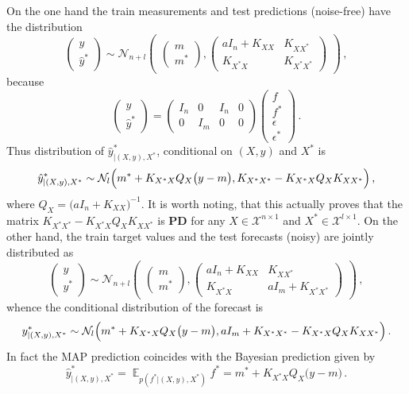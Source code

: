 \documentclass[a4paper,14pt]{article}
\newcommand{\ex}{\mathop{\mathbb{E}}\nolimits}
\newcommand{\Ncal}{\mathcal{N}}
\newcommand{\Xcal}{\mathcal{X}}
\begin{document}
On the one hand the train measurements and test predictions (noise-free) have the
distribution
$$ \begin{pmatrix} y \\ \hat{y}^* \end{pmatrix}
  \sim \Ncal_{n+l}\begin{pmatrix}
    \begin{pmatrix} m \\ m^* \end{pmatrix},
    \begin{pmatrix}
      a I_n + K_{XX} & K_{XX^*} \\
      K_{X^*X} & K_{X^*X^*}
    \end{pmatrix}
  \end{pmatrix}
  \,, $$
because
$$ \begin{pmatrix} y \\ \hat{y}^* \end{pmatrix}
  = \begin{pmatrix}
      I_n & 0 & I_n & 0 \\
      0 & I_m & 0 & 0
      \end{pmatrix}
  \begin{pmatrix} f \\ f^* \\ \epsilon \\ \epsilon^* \end{pmatrix}
  \,. $$
Thus distribution of $\hat{y}^*_{|(X, y), X^*}$, conditional on $(X,y)$ and $X^*$ is
$$ \hat{y}^*_{|(X, y), X^*}
  \sim \Ncal_l\Bigl(
    m^* + K_{X^*X} Q_X \bigl(y - m\bigr),
    K_{X^*X^*} - K_{X^*X} Q_X K_{XX^*}
  \Bigr) \,, $$
where $Q_X = \bigl(a I_n + K_{XX}\bigr)^{-1}$. It is worth noting, that this
actually proves that the matrix $K_{X^*X^*} - K_{X^*X} Q_X K_{XX^*}$ is \textbf{PD}
for any $X\in\Xcal^{n\times1}$ and $X^*\in\Xcal^{l\times1}$.
On the other hand, the train target values and the test forecasts (noisy) are jointly
distributed as
$$ \begin{pmatrix} y \\ y^* \end{pmatrix}
  \sim \Ncal_{n+l}\begin{pmatrix}
    \begin{pmatrix} m \\ m^* \end{pmatrix},
    \begin{pmatrix}
      a I_n + K_{XX} & K_{XX^*} \\
      K_{X^*X} & a I_m + K_{X^*X^*}
    \end{pmatrix}
  \end{pmatrix}
  \,, $$
whence the conditional distribution of the forecast is
$$ y^*_{|(X, y), X^*}
  \sim \Ncal_l\Bigl(
    m^* + K_{X^*X} Q_X \bigl(y - m\bigr),
    a I_m + K_{X^*X^*} - K_{X^*X} Q_X K_{XX^*}
  \Bigr)
  \,. $$
In fact the MAP prediction coincides with the Bayesian prediction
given by
$$ \hat{y}^*_{|(X, y), X^*}
  = \ex_{p(f^*|(X, y), X^*)} f^*
  = m^* + K_{X^*X} Q_X \bigl(y - m\bigr)
  \,. $$
\end{document}

